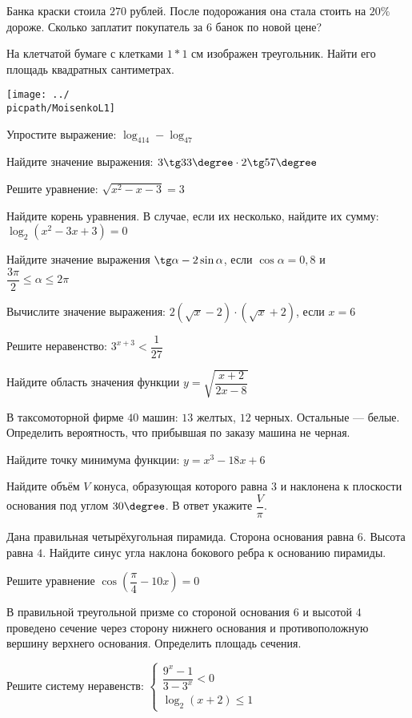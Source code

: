 
\begin{class}[number=1]
	\begin{listofex}
		\item Банка краски стоила \( 270 \) рублей. После подорожания она стала стоить на \( 20\% \) дороже. Сколько заплатит покупатель за \( 6 \) банок по новой цене?
		\item На клетчатой бумаге с клетками \( 1*1 \) см изображен треугольник. Найти его площадь квадратных сантиметрах.
		\begin{center}
			\texttt{[image: ../\\picpath/MoisenkoL1]}
		\end{center}
		\item Упростите выражение: \( \log_414-\log_47 \)
		\item Найдите значение выражения: \( 3\tg33\degree\cdot2\tg57\degree \)
		\item Решите уравнение: \( \sqrt{x^2-x-3}=3 \)
		\item Найдите корень уравнения. В случае, если их несколько, найдите их сумму: \( \log_2(x^2-3x+3)=0 \)
		\item Найдите значение выражения \( \tg\alpha-2\sin\alpha \), если \( \cos\alpha=0,8 \) и \\ \( \dfrac{3\pi}{2}\le\alpha\le2\pi \)
		\item Вычислите значение выражения: \( 2(\sqrt{x}-2)\cdot(\sqrt{x}+2) \), если \( x=6 \)
		\item Решите неравенство: \( 3^{x+3}<\dfrac{1}{27} \)
		\item Найдите область значения функции \( y=\sqrt{\dfrac{x+2}{2x-8}} \)
		\item В таксомоторной фирме \( 40 \) машин: \( 13 \) желтых, \( 12 \) черных. Остальные --- белые. Определить вероятность, что прибывшая по заказу машина не черная.
		\item Найдите точку минимума функции: \( y=x^3-18x+6 \)
		\item Найдите объём \( V \) конуса, образующая которого равна \( 3 \) и наклонена к плоскости основания под углом \( 30\degree \). В ответ укажите \( \dfrac{V}{\pi} \).
		\item Дана правильная четырёхугольная пирамида. Сторона основания равна \( 6 \). Высота равна \( 4 \). Найдите синус угла наклона бокового ребра к основанию пирамиды.
		\item Решите уравнение \( \cos\left( \dfrac{\pi}{4}-10x \right)=0 \)
		\item В правильной треугольной призме со стороной основания \( 6 \) и высотой \( 4 \) проведено сечение через сторону нижнего основания и противоположную вершину верхнего основания.
		Определить площадь сечения.
		\item Решите систему неравенств:
		\( \begin{cases} \dfrac{9^x-1}{3-3^x}<0 \\ \log_2(x+2)\le1 \end{cases} \)
	\end{listofex}
\end{class}

